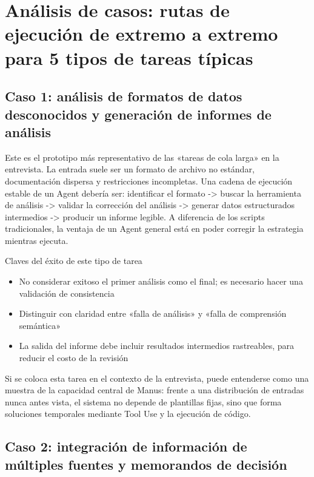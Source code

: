 \documentclass[a4paper]{article}
\begin{document}
\section{Análisis de casos: rutas de ejecución de extremo a extremo para 5 tipos de tareas típicas}

\subsection{Caso 1: análisis de formatos de datos desconocidos y generación de informes de análisis}

Este es el prototipo más representativo de las «tareas de cola larga» en la entrevista. La entrada suele ser un formato de archivo no estándar, documentación dispersa y restricciones incompletas. Una cadena de ejecución estable de un Agent debería ser: identificar el formato -> buscar la herramienta de análisis -> validar la corrección del análisis -> generar datos estructurados intermedios -> producir un informe legible. A diferencia de los scripts tradicionales, la ventaja de un Agent general está en poder corregir la estrategia mientras ejecuta.

\begin{importantbox}{Claves del éxito de este tipo de tarea}
\begin{itemize}
    \item No considerar exitoso el primer análisis como el final; es necesario hacer una validación de consistencia
    \item Distinguir con claridad entre «falla de análisis» y «falla de comprensión semántica»
    \item La salida del informe debe incluir resultados intermedios rastreables, para reducir el costo de la revisión
\end{itemize}
\end{importantbox}

Si se coloca esta tarea en el contexto de la entrevista, puede entenderse como una muestra de la capacidad central de Manus: frente a una distribución de entradas nunca antes vista, el sistema no depende de plantillas fijas, sino que forma soluciones temporales mediante Tool Use y la ejecución de código.

\subsection{Caso 2: integración de información de múltiples fuentes y memorandos de decisión}
\end{document}
